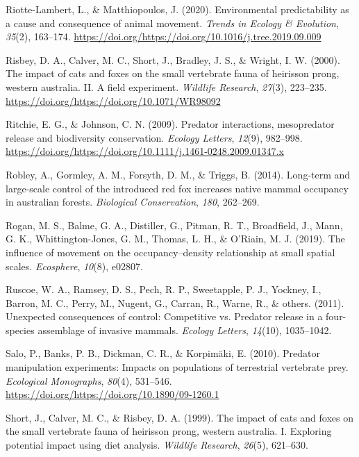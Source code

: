 \documentclass[]{elsarticle} %
\begin{document}
\leavevmode\hypertarget{ref-RIOTTELAMBERT2020163}{}%
Riotte-Lambert, L., \& Matthiopoulos, J. (2020). Environmental predictability as a cause and consequence of animal movement. \emph{Trends in Ecology \& Evolution}, \emph{35}(2), 163--174. \url{https://doi.org/https://doi.org/10.1016/j.tree.2019.09.009}

\leavevmode\hypertarget{ref-risbey2000}{}%
Risbey, D. A., Calver, M. C., Short, J., Bradley, J. S., \& Wright, I. W. (2000). The impact of cats and foxes on the small vertebrate fauna of heirisson prong, western australia. II. A field experiment. \emph{Wildlife Research}, \emph{27}(3), 223--235. \url{https://doi.org/https://doi.org/10.1071/WR98092}

\leavevmode\hypertarget{ref-ritchie2009predator}{}%
Ritchie, E. G., \& Johnson, C. N. (2009). Predator interactions, mesopredator release and biodiversity conservation. \emph{Ecology Letters}, \emph{12}(9), 982--998. \url{https://doi.org/https://doi.org/10.1111/j.1461-0248.2009.01347.x}

\leavevmode\hypertarget{ref-robley2014}{}%
Robley, A., Gormley, A. M., Forsyth, D. M., \& Triggs, B. (2014). Long-term and large-scale control of the introduced red fox increases native mammal occupancy in australian forests. \emph{Biological Conservation}, \emph{180}, 262--269.

\leavevmode\hypertarget{ref-rogan2019}{}%
Rogan, M. S., Balme, G. A., Distiller, G., Pitman, R. T., Broadfield, J., Mann, G. K., Whittington-Jones, G. M., Thomas, L. H., \& O'Riain, M. J. (2019). The influence of movement on the occupancy--density relationship at small spatial scales. \emph{Ecosphere}, \emph{10}(8), e02807.

\leavevmode\hypertarget{ref-ruscoe2011}{}%
Ruscoe, W. A., Ramsey, D. S., Pech, R. P., Sweetapple, P. J., Yockney, I., Barron, M. C., Perry, M., Nugent, G., Carran, R., Warne, R., \& others. (2011). Unexpected consequences of control: Competitive vs. Predator release in a four-species assemblage of invasive mammals. \emph{Ecology Letters}, \emph{14}(10), 1035--1042.

\leavevmode\hypertarget{ref-https:ux2fux2fdoi.orgux2f10.1890ux2f09-1260.1}{}%
Salo, P., Banks, P. B., Dickman, C. R., \& Korpimäki, E. (2010). Predator manipulation experiments: Impacts on populations of terrestrial vertebrate prey. \emph{Ecological Monographs}, \emph{80}(4), 531--546. \url{https://doi.org/https://doi.org/10.1890/09-1260.1}

\leavevmode\hypertarget{ref-short1999}{}%
Short, J., Calver, M. C., \& Risbey, D. A. (1999). The impact of cats and foxes on the small vertebrate fauna of heirisson prong, western australia. I. Exploring potential impact using diet analysis. \emph{Wildlife Research}, \emph{26}(5), 621--630.
\end{document}
